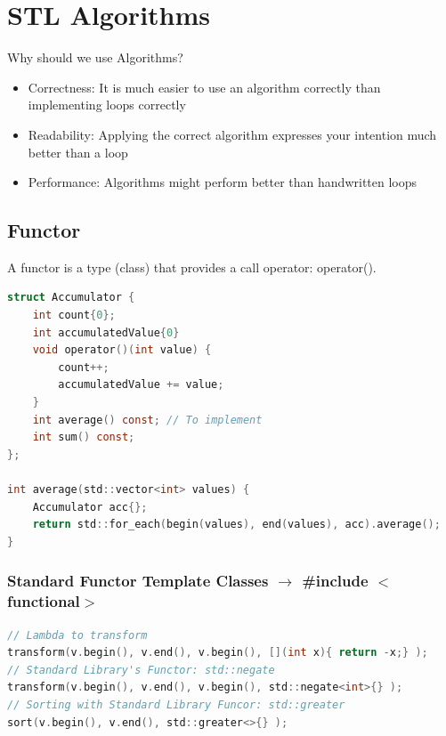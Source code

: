 
\section{STL Algorithms}

Why should we use Algorithms?
\begin{itemize}
    \item Correctness: It is much easier to use an algorithm correctly than implementing loops correctly
    \item Readability: Applying the correct algorithm expresses your intention much better than a loop
    \item Performance: Algorithms might perform better than handwritten loops
\end{itemize}
\subsection{Functor}
A functor is a type (class) that provides a call operator: operator().
\begin{lstlisting}[style=frame, style= linenumbers, language=C]
struct Accumulator {
    int count{0};
    int accumulatedValue{0}
    void operator()(int value) {
        count++;
        accumulatedValue += value;
    }
    int average() const; // To implement
    int sum() const;
};

int average(std::vector<int> values) {
    Accumulator acc{};
    return std::for_each(begin(values), end(values), acc).average();
}
\end{lstlisting}

\subsubsection{Standard Functor Template Classes $\rightarrow$ \#include $<$functional$>$}
\begin{lstlisting}[style=frame, style= linenumbers, language=C]
// Lambda to transform
transform(v.begin(), v.end(), v.begin(), [](int x){ return -x;} );
// Standard Library's Functor: std::negate
transform(v.begin(), v.end(), v.begin(), std::negate<int>{} );
// Sorting with Standard Library Funcor: std::greater
sort(v.begin(), v.end(), std::greater<>{} );
\end{lstlisting}
